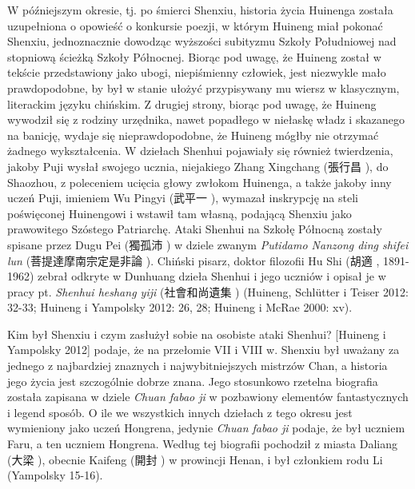 W późniejszym okresie, tj. po śmierci Shenxiu, historia życia Huinenga została uzupełniona o opowieść o konkursie poezji, w którym Huineng miał pokonać Shenxiu, jednoznacznie dowodząc wyższości subityzmu Szkoły Południowej nad stopniową ścieżką Szkoły Północnej. Biorąc pod uwagę, że Huineng został w tekście przedstawiony jako ubogi, niepiśmienny człowiek, jest niezwykle mało prawdopodobne, by był w stanie ułożyć przypisywany mu wiersz w klasycznym, literackim języku chińskim. Z drugiej strony, biorąc pod uwagę, że Huineng wywodził się z rodziny urzędnika, nawet popadłego w niełaskę władz i skazanego na banicję, wydaje się nieprawdopodobne, że Huineng mógłby nie otrzymać żadnego wykształcenia. W dziełach Shenhui pojawiały się również twierdzenia, jakoby Puji wysłał swojego ucznia, niejakiego Zhang Xingchang (張行昌 ), do Shaozhou, z poleceniem ucięcia głowy zwłokom Huinenga, a także jakoby inny uczeń Puji, imieniem Wu Pingyi (武平一 ), wymazał inskrypcję na steli poświęconej Huinengowi i wstawił tam własną, podającą Shenxiu jako prawowitego Szóstego Patriarchę. Ataki Shenhui na Szkołę Północną zostały spisane przez Dugu Pei (獨孤沛 ) w dziele zwanym \textit{Putidamo Nanzong ding shifei lun} (菩提達摩南宗定是非論 ). Chiński pisarz, doktor filozofii Hu Shi (胡適 , 1891-1962) zebrał odkryte w Dunhuang dzieła Shenhui i jego uczniów i opisał je w pracy pt. \textit{Shenhui heshang yiji} (社會和尚遺集 ) %
(Huineng, Schlütter i Teiser 2012: 32-33; Huineng i Yampolsky 2012: 26, 28; Huineng i McRae 2000: xv).

Kim był Shenxiu i czym zasłużył sobie na osobiste ataki Shenhui? [Huineng i Yampolsky 2012] podaje, że na przełomie VII i VIII w. Shenxiu był uważany za jednego z najbardziej znaznych i najwybitniejszych mistrzów Chan, a historia jego życia jest szczogólnie dobrze znana. Jego stosunkowo rzetelna biografia została zapisana w dziele \textit{Chuan fabao ji} w pozbawiony elementów fantastycznych i legend sposób. O ile we wszystkich innych dziełach z tego okresu jest wymieniony jako uczeń Hongrena, jedynie \textit{Chuan fabao ji} podaje, że był uczniem Faru, a ten uczniem Hongrena. Według tej biografii pochodził z miasta Daliang (大梁 ), obecnie Kaifeng (開封 ) w prowincji Henan, i był członkiem rodu Li (Yampolsky 15-16). %

